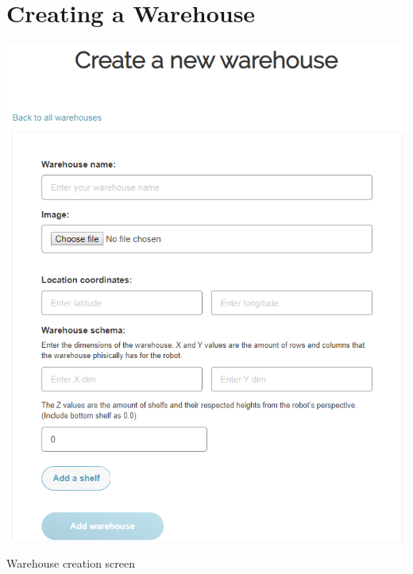 \documentclass[onecolumn]{IEEEtran}
\begin{document}
\section{Creating a Warehouse}
\noindent\begin{minipage}{0.35\textwidth}
\begin{center}
    \includegraphics[width=\linewidth]{add-warehouse.PNG}
    \caption{Warehouse creation screen}
    \label{fig; figure}
\end{center}
\end{minipage}%
\hfill%
\end{document}
